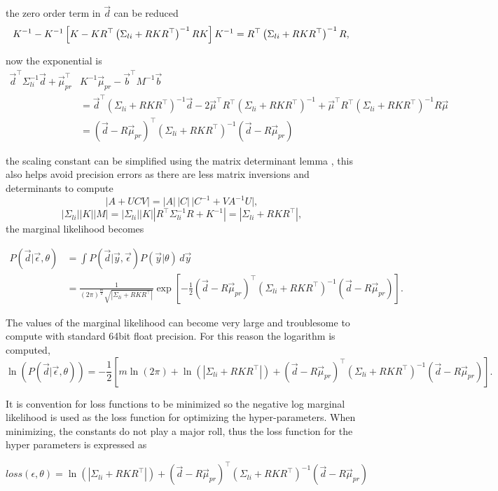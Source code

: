the zero order term in $\vec d$ can be reduced 
$$
K^{-1} - K^{-1}\left[K - K R^{\top} \left(\Sigma_{li} + RK R^{\top}\right)^{-1} R K \right] K^{-1} = R^{\top} \left(\Sigma_{li} + RK R^{\top}\right)^{-1} R,\\
$$

now the exponential is 
$$
\begin{aligned}
\vec d ^\top \Sigma_{li}^{-1} \vec d + \vec \mu_{pr}^\top &K^{-1} \vec \mu_{pr} - \vec b^\top M^{-1}\vec b \\
&= \vec{d}^{\top} \left(\Sigma_{li} + RK R^{\top}\right)^{-1} \vec{d} -2 \vec{\mu}^{\top} R^{\top} \left(\Sigma_{li} + RK R^{\top}\right)^{-1} + \vec{\mu}^{\top} R^{\top} \left(\Sigma_{li} + RK R^{\top}\right)^{-1} R \vec{\mu} \\
&= (\vec{d} - R\vec{\mu}_{pr})^{\top} (\Sigma_{li} + R K R^{\top})^{-1} (\vec{d} - R\vec{\mu}_{pr})
\end{aligned}
$$

the scaling constant can be simplified using the matrix determinant lemma \cite{gp4ml}, this also helps avoid precision errors as there are less matrix inversions and determinants to compute
$$
\lvert A + UCV \rvert = \lvert A \rvert \, \lvert C \rvert \, \lvert C^{-1} + V A^{-1} U \rvert,
$$
$$
|\Sigma_{li}||K||M| = |\Sigma_{li}||K||R^\top \Sigma_{li}^{-1} R + K^{-1}| = |\Sigma_{li} + RKR^\top|,
$$
the marginal likelihood becomes

$$
\begin{aligned}
 P(\vec d|\vec\epsilon,\theta) &= \int P(\vec{d}|\vec{y},\vec\epsilon)P(\vec{y}|\theta)  \, d\vec y \\
 &= \frac{1}{(2\pi)^{\frac{m}{2}} \sqrt{|\Sigma_{li} + RKR^\top|}} \exp\left[ -\frac{1}{2} (\vec{d} - R\vec{\mu}_{pr})^{\top} (\Sigma_{li} + R K R^{\top})^{-1} (\vec{d} - R\vec{\mu}_{pr}) \right].
\end{aligned}
$$

The values of the marginal likelihood can become very large and troublesome to compute with standard 64bit float precision. For this reason the logarithm is computed,
$$
\ln(P(\vec d| \vec \epsilon,\theta)) = -\frac{1}{2} \left[m\ln(2\pi ) + \ln(|\Sigma_{li}+RKR^\top|) +  (\vec{d} - R\vec{\mu}_{pr})^{\top} (\Sigma_{li} + R K R^{\top})^{-1} (\vec{d} - R\vec{\mu}_{pr})\right]. 
$$

It is convention for loss functions to be minimized so the negative log marginal likelihood is used as the loss function for optimizing the hyper-parameters. When minimizing, the constants do not play a major roll, thus the loss function for the hyper parameters is expressed as

$$
loss(\epsilon, \theta) = \ln(|\Sigma_{li}+RKR^\top|) +  (\vec{d} - R\vec{\mu}_{pr})^{\top} (\Sigma_{li} + R K R^{\top})^{-1} (\vec{d} - R\vec{\mu}_{pr})
$$
